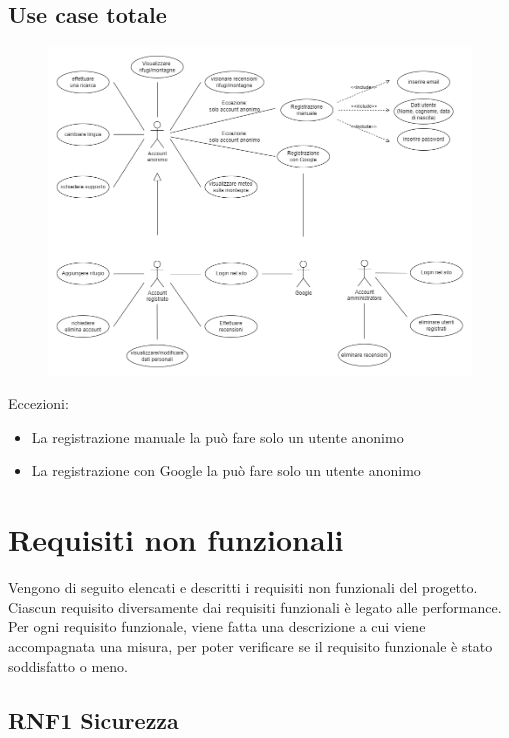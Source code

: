 \documentclass[a4paper,12pt]{article}
\begin{document}
\subsection*{Use case totale}
\begin{figure}[H]
   \centering
    \includegraphics[width=1\textwidth]{img-D2/use_case_completo.png}
    
\end{figure}
Eccezioni:
\begin{itemize}
    \item La registrazione manuale la può fare solo un utente anonimo
    \item La registrazione con Google la può fare solo un utente anonimo
\end{itemize}{}



{\newpage}
\section{Requisiti non funzionali}

Vengono di seguito elencati e descritti i requisiti non funzionali del progetto. Ciascun requisito diversamente dai requisiti funzionali è legato alle performance.\\
Per ogni requisito funzionale, viene fatta una descrizione a cui viene accompagnata una misura, per poter verificare se il requisito funzionale è stato soddisfatto o meno.

\subsection*{RNF1 Sicurezza}
\end{document}
